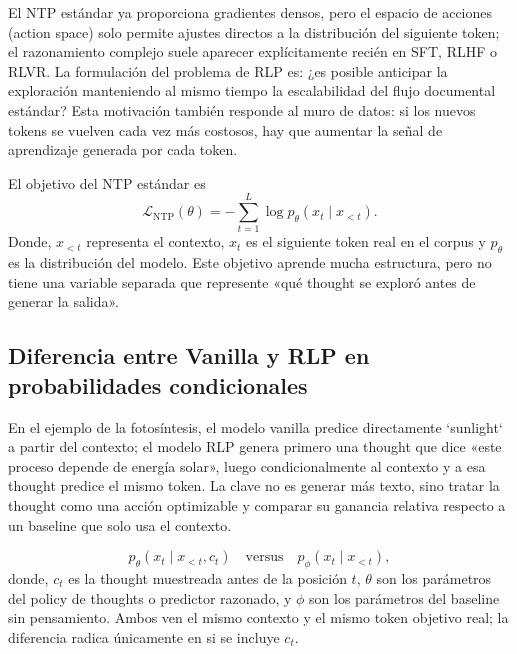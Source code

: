 El NTP estándar ya proporciona gradientes densos, pero el espacio de acciones (action space) solo permite ajustes directos a la distribución del siguiente token; el razonamiento complejo suele aparecer explícitamente recién en SFT, RLHF o RLVR. La formulación del problema de RLP es: ¿es posible anticipar la exploración manteniendo al mismo tiempo la escalabilidad del flujo documental estándar? Esta motivación también responde al muro de datos: si los nuevos tokens se vuelven cada vez más costosos, hay que aumentar la señal de aprendizaje generada por cada token.


El objetivo del NTP estándar es
\[
\mathcal{L}_{\mathrm{NTP}}(\theta)
=-\sum_{t=1}^{L}\log p_\theta(x_t\mid x_{<t}).
\]
Donde, $x_{<t}$ representa el contexto, $x_t$ es el siguiente token real en el corpus y $p_\theta$ es la distribución del modelo. Este objetivo aprende mucha estructura, pero no tiene una variable separada que represente «qué thought se exploró antes de generar la salida».

\subsection{Diferencia entre Vanilla y RLP en probabilidades condicionales}

En el ejemplo de la fotosíntesis, el modelo vanilla predice directamente `sunlight` a partir del contexto; el modelo RLP genera primero una thought que dice «este proceso depende de energía solar», luego condicionalmente al contexto y a esa thought predice el mismo token. La clave no es generar más texto, sino tratar la thought como una acción optimizable y comparar su ganancia relativa respecto a un baseline que solo usa el contexto.


\[
p_\theta(x_t\mid x_{<t},c_t)
\quad\text{versus}\quad
p_\phi(x_t\mid x_{<t}),
\]
donde, $c_t$ es la thought muestreada antes de la posición $t$, $\theta$ son los parámetros del policy de thoughts o predictor razonado, y $\phi$ son los parámetros del baseline sin pensamiento. Ambos ven el mismo contexto y el mismo token objetivo real; la diferencia radica únicamente en si se incluye $c_t$.

